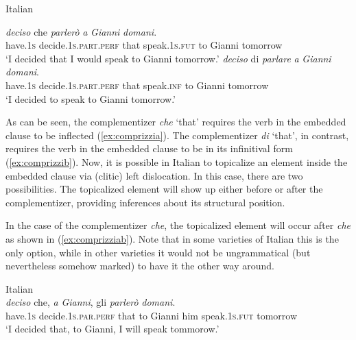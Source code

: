 \begin{exe}
\ex Italian \citep[205]{rizzi2013notes}\label{comprizziexamples}\begin{xlist} 
\ex {} {\textit{deciso}} {che} {\textit{parlerò}} {\textit{a}} {\textit{Gianni}} {\textit{domani}.} \\
{have.\textsc{1s}} {decide.\textsc{1s.part.perf}} {that} {speak.\textsc{1s.fut}} {to} {Gianni} {tomorrow} \\
\trans `I decided that I would speak to Gianni tomorrow.' \label{ex:comprizzia}
\ex {} {\textit{deciso}} {di} {\textit{parlare}} {\textit{a}} {\textit{Gianni}} {\textit{domani}.} \\
{have.\textsc{1s}} {decide.\textsc{1s.part.perf}} {that} {speak.\textsc{inf}} {to} {Gianni} {tomorrow} \\
\trans `I decided to speak to Gianni tomorrow.' \label{ex:comprizzib}
\end{xlist}
\end{exe}


\noindent As can be seen, the complementizer \textit{che} `that' requires the verb in the embedded clause to be inflected (\ref{ex:comprizzia}). The complementizer \textit{di} `that', in contrast, requires the verb in the embedded clause to be in its infinitival form (\ref{ex:comprizzib}). Now, it is possible in Italian to topicalize an element inside the embedded clause via (clitic) left dislocation. In this case, there are two possibilities. The topicalized element will show up either before or after the complementizer, providing inferences about its structural position. 

In the case of the complementizer \textit{che}, the topicalized element will occur after \textit{che} as shown in (\ref{ex:comprizziab}). Note that in some varieties of Italian this is the only option, while in other varieties it would not be ungrammatical (but nevertheless somehow marked) to have it the other way around. 

\begin{exe}
\ex Italian \citep[205]{rizzi2013notes} \\  {\textit{deciso}} {che,} {\textit{a}} {\textit{Gianni},} {gli} {\textit{parlerò}}  {\textit{domani}.} \\
{have.\textsc{1s}} {decide.\textsc{1s.par.perf}} {that} {to} {Gianni} {him} {speak.\textsc{1s.fut}}  {tomorrow} \\
\trans `I decided that, to Gianni, I will speak tommorow.' \label{ex:comprizziab}
\end{exe}

